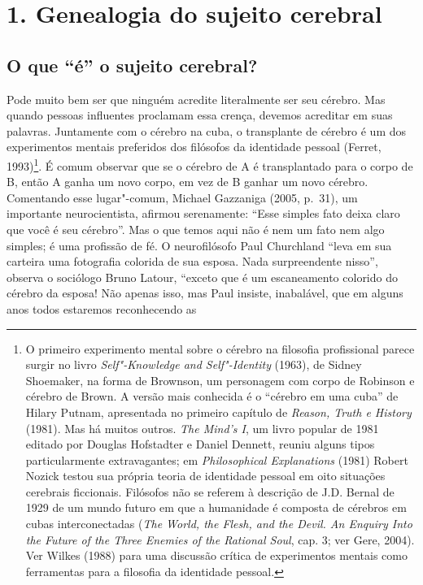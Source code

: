 \part{1. Genealogia do sujeito cerebral}

\chapter{O que ``é'' o sujeito cerebral?}

Pode muito bem ser que ninguém acredite literalmente ser seu cérebro.
Mas quando pessoas influentes proclamam essa crença, devemos acreditar
em suas palavras. Juntamente com o cérebro na cuba, o transplante de
cérebro é um dos experimentos mentais preferidos dos filósofos da
identidade pessoal (Ferret, 1993)\footnote[1]{O primeiro experimento mental sobre o cérebro na filosofia
profissional parece surgir no livro \emph{Self"-Knowledge and
Self"-Identity} (1963), de Sidney Shoemaker, na forma de Brownson, um
personagem com corpo de Robinson e cérebro de Brown. A versão mais
conhecida é o ``cérebro em uma cuba'' de Hilary Putnam, apresentada no
primeiro capítulo de \emph{Reason, Truth e History} (1981). Mas há
muitos outros. \emph{The Mind's I}, um livro popular de 1981 editado por
Douglas Hofstadter e Daniel Dennett, reuniu alguns tipos particularmente
extravagantes; em \emph{Philosophical Explanations} (1981) Robert Nozick
testou sua própria teoria de identidade pessoal em oito situações
cerebrais ficcionais. Filósofos não se referem à descrição de J.D.
Bernal de 1929 de um mundo futuro em que a humanidade é composta de
cérebros em cubas interconectadas (\emph{The World, the Flesh, and the
Devil. An Enquiry Into the Future of the Three Enemies of the Rational
Soul}, cap. 3; ver Gere, 2004). Ver Wilkes (1988) para uma discussão
crítica de experimentos mentais como ferramentas para a filosofia da
identidade pessoal.}. É comum observar
que se o cérebro de A é transplantado para o corpo de B, então A ganha
um novo corpo, em vez de B ganhar um novo cérebro. Comentando esse
lugar"-comum, Michael Gazzaniga (2005, p.~31), um importante
neurocientista, afirmou serenamente: ``Esse simples fato deixa claro que
você é seu cérebro''. Mas o que temos aqui não é nem um fato nem algo
simples; é uma profissão de fé. O neurofilósofo Paul Churchland ``leva
em sua carteira uma fotografia colorida de sua esposa. Nada
surpreendente nisso'', observa o sociólogo Bruno Latour, ``exceto que é
um escaneamento colorido do cérebro da esposa! Não apenas isso, mas Paul
insiste, inabalável, que em alguns anos todos estaremos reconhecendo as

